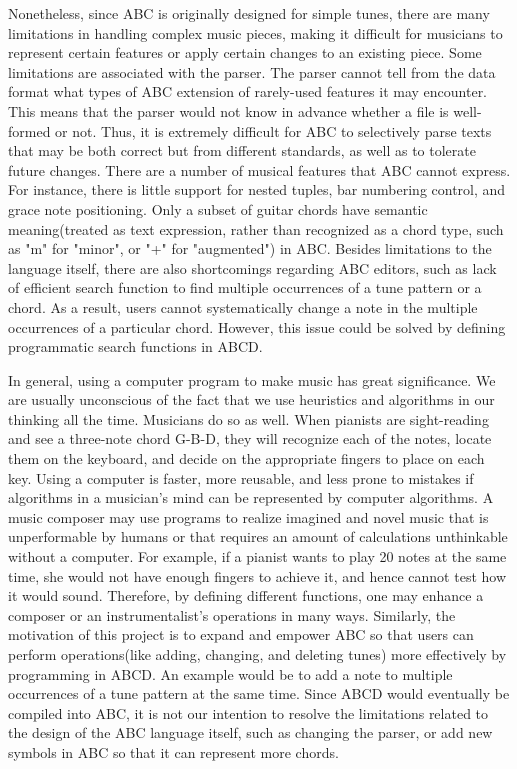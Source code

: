 Nonetheless, since ABC is originally designed for simple tunes, there are many limitations in handling complex music pieces, making it difficult for musicians to represent certain features or apply certain changes to an existing piece. Some limitations are associated with the parser. The parser cannot tell from the data format what types of ABC extension of rarely-used features it may encounter. This means that the parser would not know in advance whether a file is well-formed or not. Thus, it is extremely difficult for ABC to selectively parse texts that may be both correct but from different standards, as well as to tolerate future changes\cite{Cuthbert14}. There are a number of musical features that ABC cannot express. For instance, there is little support for nested tuples, bar numbering control, and grace note positioning\cite{Cuthbert14}. Only a subset of guitar chords have semantic meaning(treated as text expression, rather than recognized as a chord type, such as "m" for "minor", or "+" for "augmented") in ABC\cite{Chambers02}. Besides limitations to the language itself, there are also shortcomings regarding ABC editors, such as lack of efficient search function to find multiple occurrences of a tune pattern or a chord. As a result, users cannot systematically change a note in the multiple occurrences of a particular chord. However, this issue could be solved by defining programmatic search functions in ABCD.

In general, using a computer program to make music has great significance. We are usually unconscious of the fact that we use heuristics and algorithms in our thinking all the time. Musicians do so as well. When pianists are sight-reading and see a three-note chord G-B-D, they will recognize each of the notes, locate them on the keyboard, and decide on the appropriate fingers to place on each key\cite{Dobrian88}.  Using a computer is faster, more reusable, and less prone to mistakes if  algorithms in a musician's mind can be represented by computer algorithms. A music composer may use programs to realize imagined and novel music that is unperformable by humans or that requires an amount of calculations unthinkable without a computer. For example, if a pianist wants to play 20 notes at the same time, she would not have enough fingers to achieve it, and hence cannot test how it would sound. Therefore, by defining different functions, one may enhance a composer or an instrumentalist's operations in many ways\cite{Dobrian88}. Similarly, the motivation of this project is to expand and empower ABC so that users can perform operations(like adding, changing, and deleting tunes) more effectively by programming in ABCD. An example would be to add a note to multiple occurrences of a tune pattern at the same time.  Since ABCD would eventually be compiled into ABC, it is not our intention to resolve the limitations related to the design of the ABC language itself, such as changing the parser, or add new symbols in ABC so that it can represent more chords.



